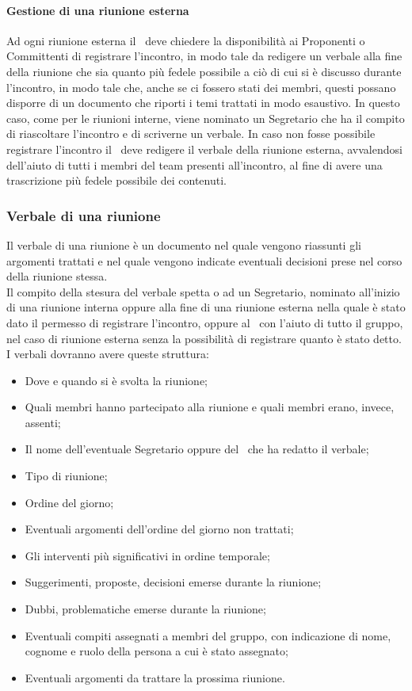 \documentclass[../NormeProgetto.tex]{subfiles}
\begin{document}
		\paragraph{Gestione di una riunione esterna}
		Ad ogni riunione esterna il \responsabilediprogetto\ deve chiedere la disponibilità ai Proponenti o Committenti di registrare l'incontro, in modo tale da redigere un verbale alla fine della riunione che sia quanto più fedele possibile a ciò di cui si è discusso durante l'incontro, in modo tale che, anche se ci fossero stati dei membri, questi possano disporre di un documento che riporti i temi trattati in modo esaustivo. In questo caso, come per le riunioni interne, viene nominato un Segretario che ha il compito di riascoltare l'incontro e di scriverne un verbale. In caso non fosse possibile registrare l'incontro il \responsabilediprogetto\ deve redigere il verbale della riunione esterna, avvalendosi dell'aiuto di tutti i membri del team presenti all'incontro, al fine di avere una trascrizione più fedele possibile dei contenuti.
		\subsubsection{Verbale di una riunione}
		Il verbale di una riunione è un documento nel quale vengono riassunti gli argomenti trattati e nel quale vengono indicate eventuali decisioni prese nel corso della riunione stessa.\\ Il compito della stesura del verbale spetta o ad un Segretario, nominato all'inizio di una riunione interna oppure alla fine di una riunione esterna nella quale è stato dato il permesso di registrare l'incontro, oppure al \responsabilediprogetto\ con l'aiuto di tutto il gruppo, nel caso di riunione esterna senza la possibilità di registrare quanto è stato detto.\\ I verbali dovranno avere queste struttura:
		\begin{itemize}
		\item Dove e quando si è svolta la riunione;
		\item Quali membri hanno partecipato alla riunione e quali membri erano, invece, assenti;
		\item Il nome dell'eventuale Segretario oppure del \responsabilediprogetto\ che ha redatto il verbale;
		\item Tipo di riunione;
		\item Ordine del giorno;
		\item Eventuali argomenti dell'ordine del giorno non trattati;
		\item Gli interventi più significativi in ordine temporale;
		\item Suggerimenti, proposte, decisioni emerse durante la riunione;
		\item Dubbi, problematiche emerse durante la riunione;
		\item Eventuali compiti assegnati a membri del gruppo, con indicazione di nome, cognome e ruolo della persona a cui è stato assegnato;
		\item Eventuali argomenti da trattare la prossima riunione.
		\end{itemize}
\end{document}
